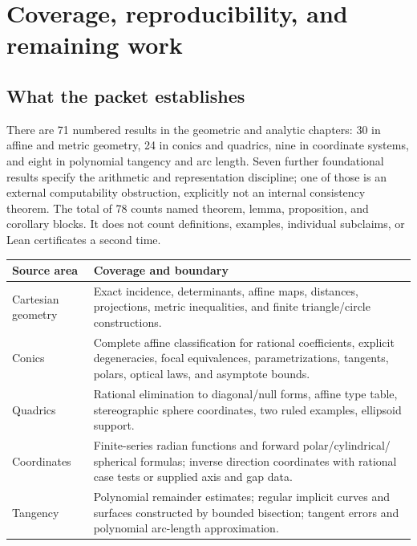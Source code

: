 \section{Coverage, reproducibility, and remaining work}
\label{sec:coverage}

\subsection{What the packet establishes}

There are 71 numbered results in the geometric and analytic chapters:
30 in affine and metric geometry, 24 in conics and quadrics, nine in
coordinate systems, and eight in polynomial tangency and arc length.
Seven further foundational results specify the arithmetic and representation
discipline; one of those is an external computability obstruction, explicitly
not an internal consistency theorem. The total of 78 counts named theorem,
lemma, proposition, and corollary blocks. It does not count definitions,
examples, individual subclaims, or Lean certificates a second time.

\begin{center}
\begin{tabular}{p{.23\linewidth}p{.65\linewidth}}
\toprule Source area & Coverage and boundary \\\midrule
Cartesian geometry & Exact incidence, determinants, affine maps, distances,
projections, metric inequalities, and finite triangle/circle constructions.\\[4pt]
Conics & Complete affine classification for rational coefficients, explicit
degeneracies, focal equivalences, parametrizations, tangents, polars, optical
laws, and asymptote bounds.\\[4pt]
Quadrics & Rational elimination to diagonal/null forms, affine type table,
stereographic sphere coordinates, two ruled examples, ellipsoid support.\\[4pt]
Coordinates & Finite-series radian functions and forward polar/cylindrical/
spherical formulas; inverse direction coordinates with rational case tests
or supplied axis and gap data.\\[4pt]
Tangency & Polynomial remainder estimates; regular implicit curves and
surfaces constructed by bounded bisection; tangent errors and polynomial
arc-length approximation.\\\bottomrule
\end{tabular}
\end{center}

